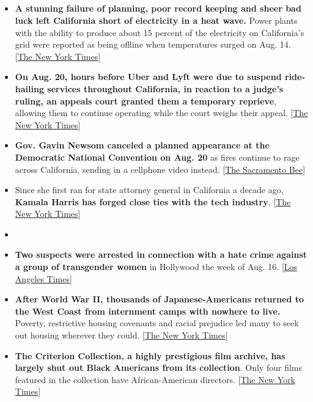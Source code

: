 \subsection{}

\begin{itemize}
\item
  \textbf{A stunning failure of planning, poor record keeping and sheer
  bad luck left California short of electricity in a heat wave.} Power
  plants with the ability to produce about 15 percent of the electricity
  on California's grid were reported as being offline when temperatures
  surged on Aug. 14.
  {[}\href{https://www.nytimes3xbfgragh.onion/2020/08/20/business/energy-environment/california-blackout-electric-grid.html}{The
  New York Times}{]}
\item
  \textbf{On Aug. 20, hours before Uber and Lyft were due to suspend
  ride-hailing services throughout California, in reaction to a judge's
  ruling, an appeals court granted them a temporary reprieve}, allowing
  them to continue operating while the court weighs their appeal.
  {[}\href{https://www.nytimes3xbfgragh.onion/2020/08/20/technology/uber-lyft-california-shutdown.html}{The
  New York Times}{]}
\item
  \textbf{Gov. Gavin Newsom canceled a planned appearance at the
  Democratic National Convention on Aug. 20} as fires continue to rage
  across California, sending in a cellphone video instead.
  {[}\href{https://www.sacbee.com/news/politics-government/capitol-alert/article245114650.html}{The
  Sacramento Bee}{]}
\item
  Since she first ran for state attorney general in California a decade
  ago, \textbf{Kamala Harris has forged close ties with the tech
  industry}.
  {[}\href{https://www.nytimes3xbfgragh.onion/2020/08/20/technology/kamala-harris-ties-to-big-tech.html}{The
  New York Times}{]}
\item
\item
  \textbf{Two suspects were arrested in connection with a hate crime}
  \textbf{against a group of transgender women} in Hollywood the week of
  Aug. 16.
  {[}\href{https://www.latimes.com/california/story/2020-08-20/two-arrested-hate-crime-robbery-transgender-women-hollywood}{Los
  Angeles Times}{]}
\item
  \textbf{After World War II, thousands of Japanese-Americans returned
  to the West Coast from internment camps with nowhere to live.}
  Poverty, restrictive housing covenants and racial prejudice led many
  to seek out housing wherever they could.
  {[}\href{https://www.nytimes3xbfgragh.onion/2020/08/20/magazine/japanese-internment-end-wwii-trailer-parks.html}{The
  New York Times}{]}
\item
  \textbf{The Criterion Collection, a highly prestigious film archive,
  has largely shut out Black Americans from its collection}. Only four
  films featured in the collection have African-American directors.
  {[}\href{https://www.nytimes3xbfgragh.onion/interactive/2020/08/20/movies/criterion-collection-african-americans.html}{The
  New York Times}{]}
\end{itemize}

